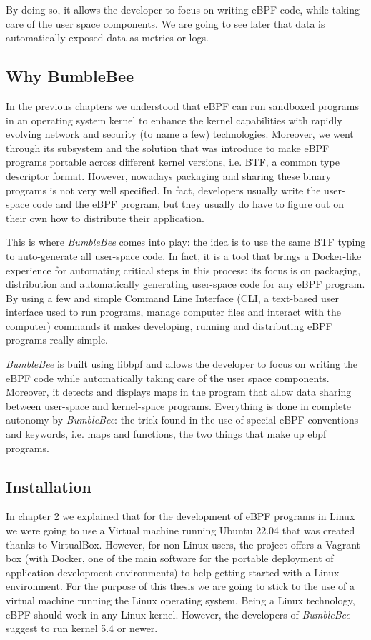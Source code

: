 By doing so, it allows the developer to focus on writing eBPF code, while taking care of the user space components.
We are going to see later that data is automatically exposed data as metrics or logs.

\subsection{Why BumbleBee}

In the previous chapters we understood that eBPF can run sandboxed programs in an operating system kernel to enhance the kernel capabilities with rapidly evolving network and security (to name a few) technologies.
Moreover, we went through its subsystem and the solution that was introduce to make eBPF programs portable across different kernel versions, i.e. BTF, a common type descriptor format.
However, nowadays packaging and sharing these binary programs is not very well specified. 
In fact, developers usually write the user-space code and the eBPF program, but they usually do have to figure out on their own how to distribute their application.

This is where \textit{BumbleBee} comes into play: the idea is to use the same BTF typing to auto-generate all user-space code.
In fact, it is a tool that brings a Docker-like experience for automating critical steps in this process: its focus is on packaging, distribution and automatically generating user-space code for any eBPF program. 
By using a few and simple Command Line Interface (CLI, a text-based user interface
used to run programs, manage computer files and interact with the computer) commands it makes developing, running and distributing eBPF programs really simple.

\textit{BumbleBee} is built using libbpf and allows the developer to focus on writing the eBPF code while automatically taking care of the user space components. 
Moreover, it detects and displays maps in the program that allow data sharing between user-space and kernel-space programs. 
Everything is done in complete autonomy by \textit{BumbleBee}: the trick found in the use of special eBPF conventions and keywords, i.e. maps and functions, the two things that make up ebpf programs.

\subsection{Installation}

In chapter 2 we explained that for the development of eBPF programs in Linux we were going to use a Virtual machine running Ubuntu 22.04 that was created thanks to VirtualBox.
However, for non-Linux users, the project offers a Vagrant box \cite{BumblebeeVagrant} (with Docker, one of the main software for the portable deployment of application development environments) to help getting started with a Linux environment.
For the purpose of this thesis we are going to stick to the use of a virtual machine running the Linux operating system.
Being a Linux technology, eBPF should work in any Linux kernel.
However, the developers of \textit{BumbleBee} suggest to run kernel 5.4 or newer.

